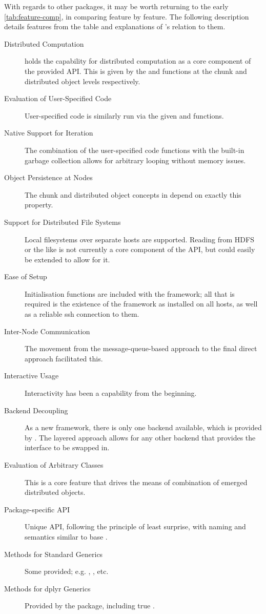 With regards to other packages, it may be worth returning to the early \cref{tab:feature-comp}, in comparing feature by feature.
The following description details features from the table and explanations of \lsr{}'s relation to them.

\begin{description}
\item[Distributed Computation] \lsr{} holds the capability for distributed computation as a core component of the provided API. This is given by the  and  functions at the chunk and distributed object levels respectively.
\item[Evaluation of User-Specified Code] User-specified code is similarly run via the given  and  functions.
\item[Native Support for Iteration] The combination of the user-specified code functions with the built-in garbage collection allows for arbitrary looping without memory issues.
\item[Object Persistence at Nodes] The chunk and distributed object concepts in \lsr{} depend on exactly this property.
\item[Support for Distributed File Systems] Local filesystems over separate hosts are supported. Reading from HDFS or the like is not currently a core component of the API, but could easily be extended to allow for it.
\item[Ease of Setup] Initialisation functions are included with the framework; all that is required is the existence of the framework as installed on all hosts, as well as a reliable ssh connection to them.
\item[Inter-Node Communication] The movement from the message-queue-based approach to the final direct approach facilitated this.
\item[Interactive Usage] Interactivity has been a capability from the beginning.
\item[Backend Decoupling] As a new framework, there is only one backend available, which is provided by \orcv{}. The layered approach allows for any other backend that provides the \orcv{} interface to be swapped in.
\item[Evaluation of Arbitrary Classes] This is a core feature that drives the means of combination of emerged distributed objects.
\item[Package-specific API] Unique API, following the principle of least surprise, with naming and semantics similar to base \R{}.
\item[Methods for Standard Generics] Some provided; e.g. , , etc.
\item[Methods for dplyr Generics] Provided by the \lso{} package, including true .
\end{description}


